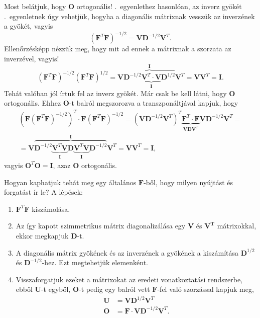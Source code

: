 \documentclass[12pt,a4paper]{scrartcl}
\let\mathbf\bm
\begin{document}
Most belátjuk, hogy ${\mathbf{O}}$ ortogonális! \Az{\eqref{eq:diag_m_fgv}}.\ egyenlethez hasonlóan, az inverz gyökét \az{\eqref{eq:szimm_def_grad}}.\ egyenletnek úgy vehetjük, hogyha a diagonális mátrixnak vesszük az inverzének a gyökét, vagyis
\[{\left( {{{\mathbf{F}}^T}{\mathbf{F}}} \right)^{ - 1/2}} = {\mathbf{V}}{{\mathbf{D}}^{ - 1/2}}{{\mathbf{V}}^T}.\]
Ellenőrzésképp nézzük meg, hogy mit ad ennek a mátrixnak a szorzata az inverzével, vagyis!
\[{\left( {{{\mathbf{F}}^T}{\mathbf{F}}} \right)^{ - 1/2}}{\left( {{{\mathbf{F}}^T}{\mathbf{F}}} \right)^{1/2}} = {\mathbf{V}}\overbrace {{{\mathbf{D}}^{ - 1/2}}\underbrace {{{\mathbf{V}}^T} \cdot {\mathbf{V}}}_{\mathbf{I}}{{\mathbf{D}}^{1/2}}}^{\mathbf{I}}{{\mathbf{V}}^T} = {\mathbf{V}}{{\mathbf{V}}^T} = {\mathbf{I}}.\]
Tehát valóban jól írtuk fel az inverz gyökét. Már csak be kell látni, hogy ${\mathbf{O}}$ ortogonális. Ehhez ${\mathbf{O}}$-t balról megszorozva a transzponáltjával kapjuk, hogy
\begin{multline*}
{\left( {{\mathbf{F}}{{\left( {{{\mathbf{F}}^T}{\mathbf{F}}} \right)}^{ - 1/2}}} \right)^T} \cdot {\mathbf{F}}{\left( {{{\mathbf{F}}^T}{\mathbf{F}}} \right)^{ - 1/2}} = {\left( {{\mathbf{V}}{{\mathbf{D}}^{ - 1/2}}{{\mathbf{V}}^T}} \right)^T}\underbrace {{{\mathbf{F}}^T} \cdot {\mathbf{F}}}_{{\mathbf{VD}}{{\mathbf{V}}^T}}{\mathbf{V}}{{\mathbf{D}}^{ - 1/2}}{{\mathbf{V}}^T} = \\ = {\mathbf{V}}\overbrace {{{\mathbf{D}}^{ - 1/2}}\underbrace {{{\mathbf{V}}^T}{\mathbf{V}}}_{\mathbf{I}}{\mathbf{D}}\underbrace {{{\mathbf{V}}^T}{\mathbf{V}}}_{\mathbf{I}}{{\mathbf{D}}^{ - 1/2}}}^{\mathbf{I}}{{\mathbf{V}}^T} = {\mathbf{V}}{{\mathbf{V}}^T} = {\mathbf{I}},
\end{multline*}
vagyis ${{\mathbf{O}}^T}{\mathbf{O}} = {\mathbf{I}}$, azaz ${\mathbf{O}}$ ortogonális.

Hogyan kaphatjuk tehát meg egy általános ${\mathbf{F}}$-ből, hogy milyen nyújtást és forgatást ír le? A lépések:
\begin{enumerate}
\item ${{{\mathbf{F}}^T}{\mathbf{F}}}$ kiszámolása.
\item Az így kapott szimmetrikus mátrix diagonalizálása egy ${\mathbf{V}}$ és ${\mathbf{V^T}}$ mátrixokkal, ekkor megkapjuk ${\mathbf{D}}$-t.
\item A diagonális mátrix gyökének és az inverzének a gyökének a kiszámítása ${{\mathbf{D}}^{1/2}}$ és ${{\mathbf{D}}^{ - 1/2}}$-hez. Ezt megtehetjük elemenként.
\item Visszaforgatjuk ezeket a mátrixokat az eredeti vonatkoztatási rendszerbe, ebből ${\mathbf{U}}$-t egyből, ${\mathbf{O}}$-t pedig egy balról vett ${\mathbf{F}}$-fel való szorzással kapjuk meg,
\[\begin{aligned}
  {\mathbf{U}} &  = {\mathbf{V}}{{\mathbf{D}}^{1/2}}{{\mathbf{V}}^T} \\ 
  {\mathbf{O}} &  = {\mathbf{F}} \cdot {\mathbf{V}}{{\mathbf{D}}^{ - 1/2}}{{\mathbf{V}}^T}. \\ 
\end{aligned} \]
\end{enumerate}
\end{document}
